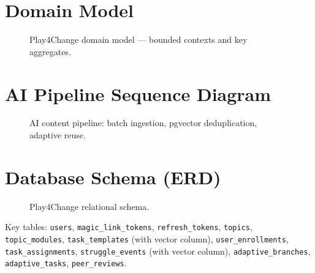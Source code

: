 \section{Domain Model}
\label{app:domain_model}

\begin{figure}[htbp]
    \centering
    \caption{Play4Change domain model — bounded contexts and key aggregates.}
    \label{fig:app_domain}
\end{figure}

\section{AI Pipeline Sequence Diagram}
\label{app:ai_sequence}

\begin{figure}[htbp]
    \centering
    \caption{AI content pipeline: batch ingestion, pgvector deduplication, adaptive reuse.}
    \label{fig:app_ai_pipeline}
\end{figure}

\section{Database Schema (ERD)}
\label{app:erd}

\begin{figure}[htbp]
    \centering
    \caption{Play4Change relational schema.}
    \label{fig:app_erd}
\end{figure}

Key tables: \texttt{users}, \texttt{magic\_link\_tokens}, \texttt{refresh\_tokens}, \texttt{topics}, \texttt{topic\_modules}, \texttt{task\_templates} (with vector column), \texttt{user\_enrollments}, \texttt{task\_assignments}, \texttt{struggle\_events} (with vector column), \texttt{adaptive\_branches}, \texttt{adaptive\_tasks}, \texttt{peer\_reviews}.

